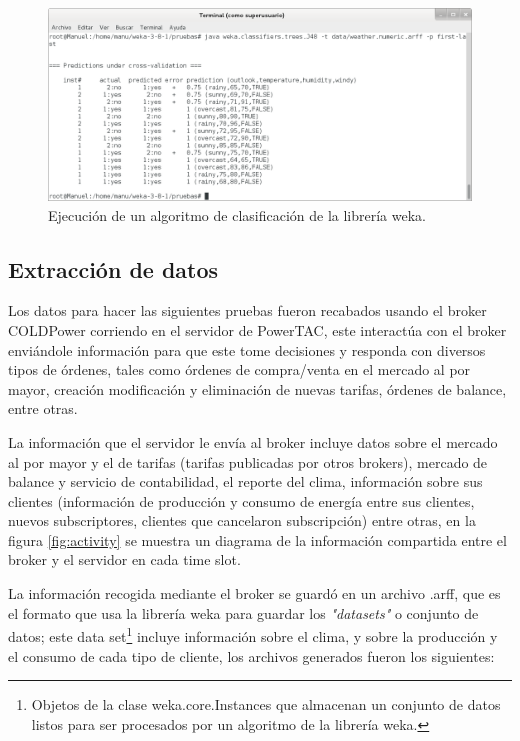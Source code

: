 \begin{figure}[h]
	\centering
	\includegraphics[width=13cm]{img/ejecucionAlgoritmoClasificacion.png}
	\caption{Ejecución de un algoritmo de clasificación de la librería weka.}
	\label{fig:ejecucionAlgoritmoClasificacion}
\end{figure}

\subsection{Extracción de datos} 
\label{subsec:extraccion}
Los datos para hacer las siguientes pruebas fueron recabados usando el broker COLDPower corriendo en el servidor de PowerTAC, este interactúa con el broker enviándole información para que este tome decisiones y responda con diversos tipos de órdenes, tales como órdenes de compra/venta en el mercado al por mayor, creación modificación y eliminación de nuevas tarifas, órdenes de balance, entre otras. 

La información que el servidor le envía al broker incluye datos sobre el mercado al por mayor y el de tarifas 
(tarifas publicadas por otros brokers), mercado de balance y servicio de contabilidad, el reporte del clima,
información sobre sus clientes (información de producción y consumo de energía entre sus clientes, nuevos subscriptores, clientes que cancelaron subscripción) entre otras, en la figura \ref{fig:activity} se muestra un diagrama de la información compartida entre el broker y el servidor en cada time slot.

La información recogida mediante el broker se guardó en un archivo .arff, que es el formato que usa la librería weka para guardar los \textit{"datasets"} o conjunto de datos; este data set\footnote{Objetos de la clase weka.core.Instances que almacenan un conjunto de datos listos para ser procesados por un algoritmo de la librería weka.} incluye información sobre el clima, y sobre la producción y el consumo de cada tipo de cliente, los archivos generados fueron los siguientes: \\

